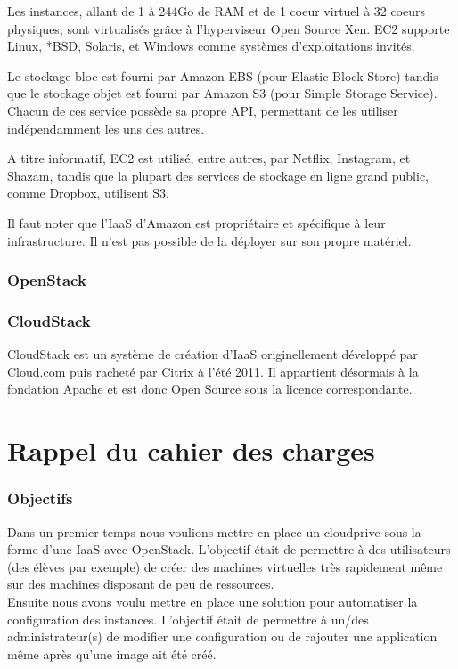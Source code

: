 \documentclass[a4paper,oneside]{report}
\begin{document}
Les instances, allant de 1 à 244Go de RAM et de 1 coeur virtuel à 32 coeurs physiques, sont virtualisés grâce à l'hyperviseur Open Source Xen.
EC2 supporte Linux, *BSD, Solaris, et Windows comme systèmes d'exploitations invités.

Le stockage bloc est fourni par Amazon EBS (pour Elastic Block Store) tandis que le stockage objet est fourni par Amazon S3 (pour Simple Storage Service).
Chacun de ces service possède sa propre API, permettant de les utiliser indépendamment les uns des autres.

A titre informatif, EC2 est utilisé, entre autres, par Netflix, Instagram, et Shazam, tandis que la plupart des services de stockage en ligne grand public, comme Dropbox, utilisent S3.

Il faut noter que l'IaaS d'Amazon est propriétaire et spécifique à leur infrastructure. Il n'est pas possible de la déployer sur son propre matériel.

\subsubsection{OpenStack}

\subsubsection{CloudStack}
CloudStack est un système de création d'IaaS originellement développé par Cloud.com puis racheté par Citrix à l'été 2011.
Il appartient désormais à la fondation Apache et est donc Open Source sous la licence correspondante.\newline


\section{Rappel du cahier des charges}
\subsubsection{Objectifs}
Dans un premier temps nous voulions mettre en place un \gls{cloudprive} sous la forme d'une IaaS avec OpenStack.
L'objectif était de permettre à des utilisateurs (des élèves par exemple) de créer des machines virtuelles très rapidement même sur des machines disposant de peu de ressources.\\

Ensuite nous avons voulu mettre en place une solution pour automatiser la configuration des instances.
L'objectif était de permettre à un/des administrateur(s) de modifier une configuration ou de rajouter une application même après qu'une image ait été créé.
\end{document}
